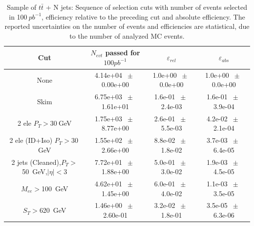 \begin{table}[htbp] 
\begin{center} 
\begin{tabular}{|c|c|c|c|} 
\hline\hline 
 Cut & $N_{evt}$ passed for $100pb^{-1}$ & $\varepsilon_{rel}$ & $\varepsilon_{abs}$ \\ 
\hline\hline 
None       &        4.14e+04       $~\pm~$       0.00e+00        &        1.0e+00       $~\pm~$       0.0e+00        &        1.0e+00       $~\pm~$       0.0e+00       \\       
       Skim       &        6.75e+03       $~\pm~$       1.61e+01        &        1.6e-01       $~\pm~$       2.4e-03        &        1.6e-01       $~\pm~$       3.9e-04       \\       
       2 ele $P_T>30~$GeV       &        1.75e+03       $~\pm~$       8.77e+00        &        2.6e-01       $~\pm~$       5.5e-03        &        4.2e-02       $~\pm~$       2.1e-04       \\       
       2 ele (ID+Iso) $P_T>30~$GeV       &        1.55e+02       $~\pm~$       2.66e+00        &        8.8e-02       $~\pm~$       1.8e-02        &        3.7e-03       $~\pm~$       6.4e-05       \\       
       2 jets (Cleaned),$P_T>$50~GeV,$|\eta|<$3       &        7.72e+01       $~\pm~$       1.88e+00        &        5.0e-01       $~\pm~$       3.0e-02        &        1.9e-03       $~\pm~$       4.5e-05       \\       
       $M_{ee}>$100~GeV       &        4.62e+01       $~\pm~$       1.45e+00        &        6.0e-01       $~\pm~$       4.0e-02        &        1.1e-03       $~\pm~$       3.5e-05       \\       
       $S_T>$620~GeV       &        1.46e+00       $~\pm~$       2.60e-01        &        3.2e-02       $~\pm~$       1.8e-01        &        3.5e-05       $~\pm~$       6.3e-06       \\       
          \hline\hline 
\end{tabular} 
\end{center} 
\caption{Sample of $t\bar{t}$ + N jets: Sequence of selection cuts with number of events selected in 100$~pb^{-1}$, efficiency relative to the preceding cut and absolute efficiency.  The reported uncertainties on the number of events and efficiencies are statistical, due to the number of analyzed MC events.} 
\label{tab:effic-ttbar} 
\end{table} 

